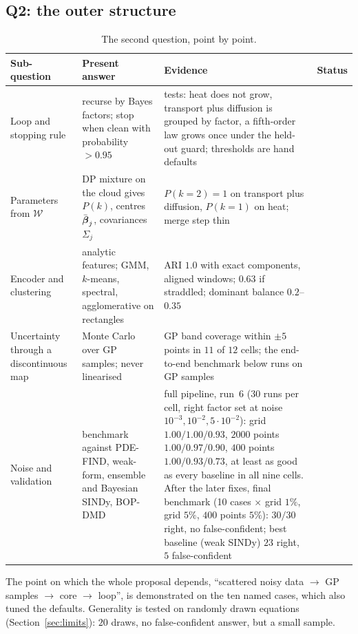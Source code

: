 \subsection{Q2: the outer structure}
\begin{table}[!htb]
\centering\small
\begin{tabular}{@{}L{3.0cm}L{5.2cm}L{4.4cm}L{1.8cm}@{}}
\toprule
Sub-question & Present answer & Evidence & Status\\\midrule
Loop and stopping rule & recurse by Bayes factors; stop when clean with probability $>0.95$ & tests: heat does not grow, transport plus diffusion is grouped by factor, a fifth-order law grows once under the held-out guard; thresholds are hand defaults & \impl{}\\
Parameters from $\mathcal W$ & DP mixture on the cloud gives $P(k)$, centres $\bar{\boldsymbol\beta}_j$, covariances $\Sigma_j$ & $P(k=2)=1$ on transport plus diffusion, $P(k=1)$ on heat; merge step thin & \implu{}\\
Encoder and clustering & analytic features; GMM, $k$-means, spectral, agglomerative on rectangles & ARI $1.0$ with exact components, aligned windows; $0.63$ if straddled; dominant balance $0.2$--$0.35$ & \implu{}\\
Uncertainty through a discontinuous map & Monte Carlo over GP samples; never linearised & GP band coverage within $\pm5$ points in $11$ of $12$ cells; the end-to-end benchmark below runs on GP samples & \impl{}\\
Noise and validation & benchmark against PDE-FIND, weak-form, ensemble and Bayesian SINDy, BOP-DMD & full pipeline, run~6 (30 runs per cell, right factor set at noise $10^{-3},10^{-2},5\cdot10^{-2}$): grid $1.00/1.00/0.93$, $2000$ points $1.00/0.97/0.90$, $400$ points $1.00/0.93/0.73$, at least as good as every baseline in all nine cells. After the later fixes, final benchmark (10 cases $\times$ grid $1\%$, grid $5\%$, $400$ points $5\%$): $30/30$ right, no false-confident; best baseline (weak SINDy) $23$ right, $5$ false-confident & \impl{}\\
\bottomrule
\end{tabular}
\caption{The second question, point by point.}
\end{table}

\begin{keypoint}
The point on which the whole proposal depends, ``scattered noisy data $\to$ GP samples $\to$ core $\to$ loop'', is demonstrated on the ten named cases, which also tuned the defaults. Generality is tested on randomly drawn equations (Section~\ref{sec:limits}): $20$ draws, no false-confident answer, but a small sample.
\end{keypoint}
